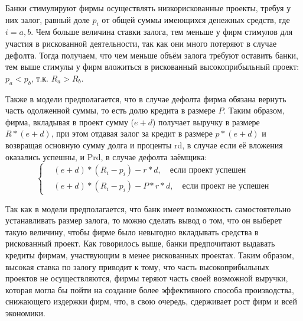 Банки стимулируют фирмы осуществлять низкорискованные проекты, требуя у них залог, равный доле $p_i$ от общей суммы имеющихся денежных средств, где $i = a,b$. Чем больше величина ставки залога, тем меньше у фирм стимулов для участия в рискованной деятельности, так как они много потеряют в случае дефолта. Тогда получаем, что чем меньше объём залога требуют оставить банки, тем выше стимулы у фирм вложиться в рискованный высокоприбыльный проект: $p_a < p_b$, т.к. $R_a > R_b$. 

Также в модели предполагается, что в случае дефолта фирма обязана вернуть часть одолженной суммы, то есть долю кредита в размере $P$. Таким образом, фирма, вкладывая в проект сумму ($e+d$) получает выручку в размере $R*(e+d)$, при этом отдавая залог за кредит в размере $p*(e+d)$  и возвращая основную сумму долга и проценты rd, в случае если её вложения оказались успешны, и Prd, в случае дефолта заёмщика:
\renewcommand{\theequation}{\arabic{equation}}
\begin{equation}
\left \{
\begin{aligned}
&(e+d)*(R_i-p_i )-r*d,   \quad \text{если проект успешен} \\
&(e+d)*(R_i-p_i )-P*r*d, \quad \text{если проект не успешен}
\end{aligned}
\right.
\end{equation}

Так как в модели предполагается, что банк имеет возможность самостоятельно устанавливать размер залога, то можно сделать вывод о том, что он выберет такую величину, чтобы фирме было невыгодно вкладывать средства в рискованный проект. Как говорилось выше, банки предпочитают выдавать кредиты фирмам, участвующим в менее рискованных проектах. Таким образом, высокая ставка по залогу приводит к тому, что часть высокоприбыльных проектов не осуществляются, фирмы теряют часть своей возможной выручки, которая могла бы пойти на создание более эффективного способа производства, снижающего издержки фирм, что, в свою очередь, сдерживает рост фирм и всей экономики.